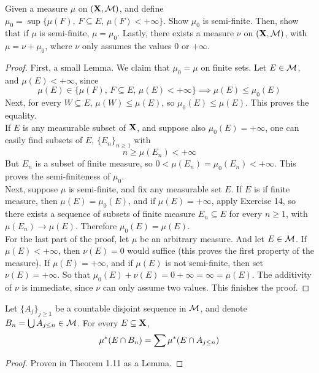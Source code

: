 \documentclass[../../main.tex]{subfiles}
\begin{document}
\begin{wts}
    Given a measure $\mu$ on $({\mathbf{X}},\mathcal{M})$, and define $\mu_0 = \sup\{\mu(F),\, F\subseteq E,\, \mu(F)<+\infty\}$. Show $\mu_0$ is semi-finite. Then, show that if $\mu$ is semi-finite, $\mu=\mu_0$. Lastly, there exists a measure $\nu$ on $({\mathbf{X}},\mathcal{M})$, with $\mu = \nu + \mu_0$, where $\nu$ only assumes the values $0$ or $+\infty$.
\end{wts}
\begin{proof}
First, a small Lemma. We claim that $\mu_0 = \mu$ on finite sets. Let $E\in\mathcal{M}$, and $\mu(E)<+\infty$, since \[\mu(E)\in\{\mu(F),\, F\subseteq E,\,\mu(E)<+\infty\}\implies \mu(E)\leq \mu_0(E)\]
Next, for every $W\subseteq E$, $\mu(W)\leq \mu(E)$, so $\mu_0(E)\leq \mu(E)$. This proves the equality.\\

If $E$ is any measurable subset of ${\mathbf{X}}$, and suppose also $\mu_0(E)=+\infty$,  one can easily find subsets of $E$, $\{E_n\}_{n\geq 1}$ with\[n\geq \mu(E_n)<+\infty\]
But $E_n$ is a subset of finite measure, so $0<\mu(E_n)=\mu_0(E_n)<+\infty$. This proves the semi-finiteness of $\mu_0$.\\

Next, suppose $\mu$ is semi-finite, and fix any measurable set $E$. If $E$ is if finite measure, then $\mu(E)=\mu_0(E)$, and if $\mu(E)=+\infty$, apply Exercise 14, so there exists a sequence of subsets of finite measure $E_n\subseteq E$ for every $n\geq 1$, with $\mu(E_n)\to \mu(E)$. Therefore $\mu_0(E)=\mu(E)$.\\

For the last part of the proof, let $\mu$ be an arbitrary measure. And let $E\in\mathcal{M}$. If $\mu(E)<+\infty$, then $\nu(E)=0$ would suffice (this proves the first property of the measure). If $\mu(E)=+\infty$, and if $\mu(E)$ is not semi-finite, then set $\nu(E)=+\infty$. So that $\mu_0(E)+\nu(E)=0 + \infty = \infty = \mu(E)$. The additivity of $\nu$ is immediate, since $\nu$ can only assume two values. This finishes the proof.
\end{proof}
\newpage

\begin{wts}
    Let $\{A_j\}_{j\geq 1}$ be a countable disjoint sequence in $\mathcal{M}$, and denote $B_n = \bigcup A_{j\leq n}\in\mathcal{M}$. For every $E\subseteq {\mathbf{X}}$, 
    \[
        \mu^*(E\cap B_n) = \sum\mu^*(E\cap A_{j\leq n})
    \]
\end{wts}
\begin{proof}
    Proven in Theorem 1.11 as a Lemma.
\end{proof}
\newpage
\end{document}

